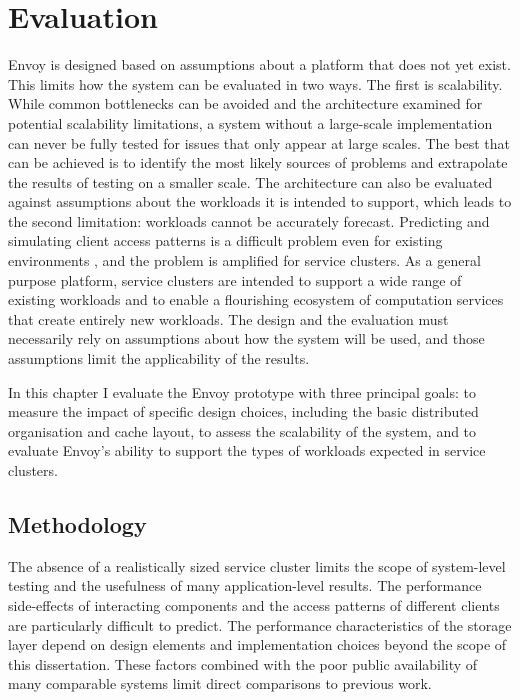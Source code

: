 \chapter{Evaluation}\label{cha:evaluation}

Envoy is designed based on assumptions about a platform that does not yet exist. This limits how the system can be evaluated in two ways. The first is scalability. While common bottlenecks can be avoided and the architecture examined for potential scalability limitations, a system without a large-scale implementation can never be fully tested for issues that only appear at large scales. The best that can be achieved is to identify the most likely sources of problems and extrapolate the results of testing on a smaller scale. The architecture can also be evaluated against assumptions about the workloads it is intended to support, which leads to the second limitation: workloads cannot be accurately forecast. Predicting and simulating client access patterns is a difficult problem even for existing environments \cite{ganger95}, and the problem is amplified for service clusters. As a general purpose platform, service clusters are intended to support a wide range of existing workloads and to enable a flourishing ecosystem of computation services that create entirely new workloads. The design and the evaluation must necessarily rely on assumptions about how the system will be used, and those assumptions limit the applicability of the results.

In this chapter I evaluate the Envoy prototype with three principal goals: to measure the impact of specific design choices, including the basic distributed organisation and cache layout, to assess the scalability of the system, and to evaluate Envoy's ability to support the types of workloads expected in service clusters.

\section{Methodology}

The absence of a realistically sized service cluster limits the scope of system-level testing and the usefulness of many application-level results. The performance side-effects of interacting components and the access patterns of different clients are particularly difficult to predict. The performance characteristics of the storage layer depend on design elements and implementation choices beyond the scope of this dissertation. These factors combined with the poor public availability of many comparable systems limit direct comparisons to previous work.

